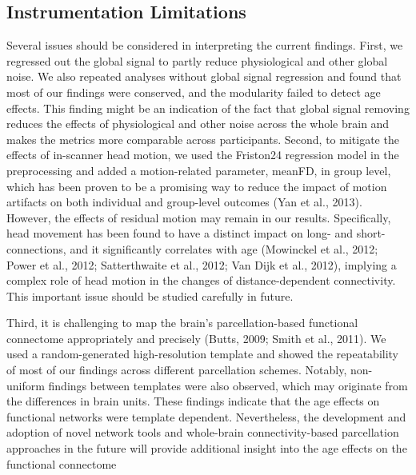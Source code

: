 \subsection{Instrumentation Limitations}
Several issues should be considered in interpreting the
current findings. First, we regressed out the global signal to partly reduce 
physiological and other global noise.
We also repeated analyses without global signal regression and found that 
most of our findings were conserved,
and the modularity failed to detect age effects. This finding might be an 
indication of the fact that global signal
removing reduces the effects of physiological and other
noise across the whole brain and makes the metrics more
comparable across participants. Second, to mitigate the
effects of in-scanner head motion, we used the Friston24 regression model in 
the preprocessing and added a
motion-related parameter, meanFD, in group level, which
has been proven to be a promising way to reduce the impact
of motion artifacts on both individual and group-level
outcomes (Yan et al., 2013). However, the effects of residual
motion may remain in our results. Specifically, head movement has been found 
to have a distinct impact on long- and short-connections, and it significantly correlates with age
(Mowinckel et al., 2012; Power et al., 2012; Satterthwaite
et al., 2012; Van Dijk et al., 2012), implying a complex
role of head motion in the changes of distance-dependent
connectivity. This important issue should be studied carefully in future.

Third, it is challenging to map the brain’s
parcellation-based functional connectome appropriately
and precisely (Butts, 2009; Smith et al., 2011). We used a
random-generated high-resolution template and showed
the repeatability of most of our findings across different parcellation schemes. 
Notably, non-uniform findings
between templates were also observed, which may originate from the 
differences in brain units. These findings
indicate that the age effects on functional networks
were template dependent. Nevertheless, the development
and adoption of novel network tools and whole-brain
connectivity-based parcellation approaches in the future
will provide additional insight into the age effects on the
functional connectome


